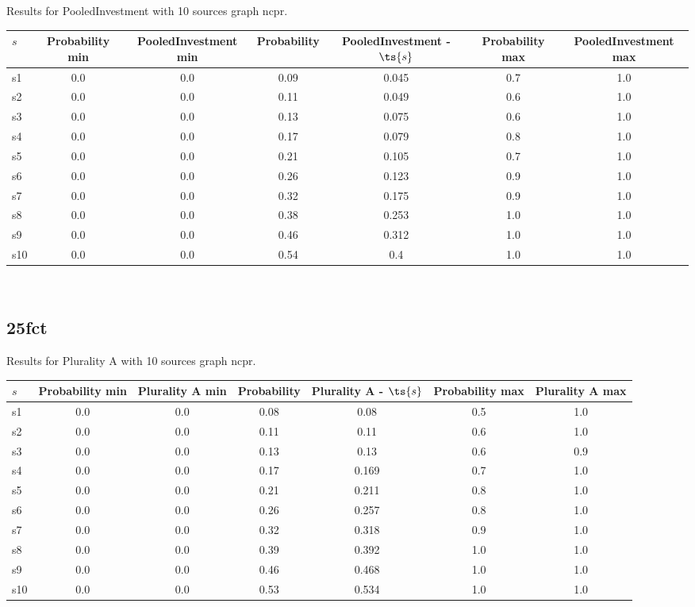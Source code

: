 \documentclass{article}
\begin{document}
\noindent Results for PooledInvestment with 10 sources graph ncpr.

\noindent\begin{tabular}{|l|c|c|c|c|c|c|}
\hline
$s$& Probability min & PooledInvestment min & Probability & PooledInvestment - $\ts{s}$ & Probability max & PooledInvestment max\\
\hline
s1 &0.0 & 0.0 & 0.09 & 0.045 & 0.7 & 1.0\\
\hline
s2 &0.0 & 0.0 & 0.11 & 0.049 & 0.6 & 1.0\\
\hline
s3 &0.0 & 0.0 & 0.13 & 0.075 & 0.6 & 1.0\\
\hline
s4 &0.0 & 0.0 & 0.17 & 0.079 & 0.8 & 1.0\\
\hline
s5 &0.0 & 0.0 & 0.21 & 0.105 & 0.7 & 1.0\\
\hline
s6 &0.0 & 0.0 & 0.26 & 0.123 & 0.9 & 1.0\\
\hline
s7 &0.0 & 0.0 & 0.32 & 0.175 & 0.9 & 1.0\\
\hline
s8 &0.0 & 0.0 & 0.38 & 0.253 & 1.0 & 1.0\\
\hline
s9 &0.0 & 0.0 & 0.46 & 0.312 & 1.0 & 1.0\\
\hline
s10 &0.0 & 0.0 & 0.54 & 0.4 & 1.0 & 1.0\\
\hline
\end{tabular}\\

\newpage

\subsection{25fct}

\noindent Results for Plurality A with 10 sources graph ncpr.

\noindent\begin{tabular}{|l|c|c|c|c|c|c|}
\hline
$s$& Probability min & Plurality A min & Probability & Plurality A - $\ts{s}$ & Probability max & Plurality A max\\
\hline
s1 &0.0 & 0.0 & 0.08 & 0.08 & 0.5 & 1.0\\
\hline
s2 &0.0 & 0.0 & 0.11 & 0.11 & 0.6 & 1.0\\
\hline
s3 &0.0 & 0.0 & 0.13 & 0.13 & 0.6 & 0.9\\
\hline
s4 &0.0 & 0.0 & 0.17 & 0.169 & 0.7 & 1.0\\
\hline
s5 &0.0 & 0.0 & 0.21 & 0.211 & 0.8 & 1.0\\
\hline
s6 &0.0 & 0.0 & 0.26 & 0.257 & 0.8 & 1.0\\
\hline
s7 &0.0 & 0.0 & 0.32 & 0.318 & 0.9 & 1.0\\
\hline
s8 &0.0 & 0.0 & 0.39 & 0.392 & 1.0 & 1.0\\
\hline
s9 &0.0 & 0.0 & 0.46 & 0.468 & 1.0 & 1.0\\
\hline
s10 &0.0 & 0.0 & 0.53 & 0.534 & 1.0 & 1.0\\
\hline
\end{tabular}\\
\end{document}
